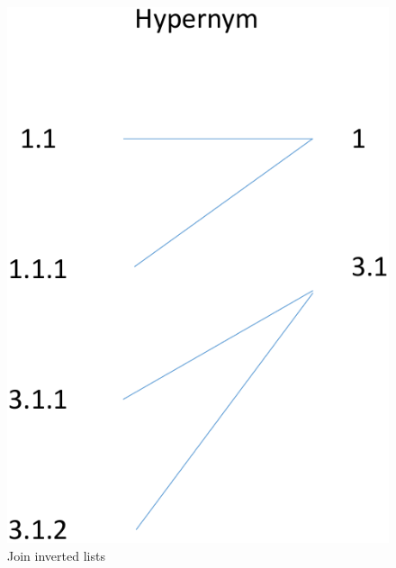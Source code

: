 \documentclass{sig-alternate}
\begin{document}
\begin{figure}[t]
\centering
\includegraphics[scale=0.4]{figures/labeljoins}
 \caption{Join inverted lists}
\label{fig:taxonomy}
\end{figure}
\end{document}
